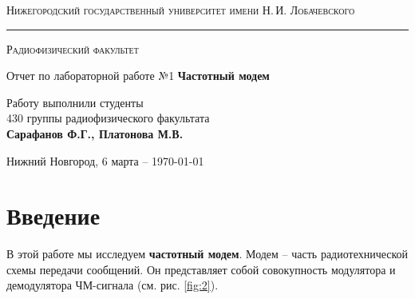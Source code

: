 \documentclass[a4paper,12pt]{article}
\def\labauthor{Сарафанов Ф.Г., Платонова М.В.}
\def\labnumber{1}
\def\labtheme{Частотный модем}
\begin{document}
\begin{titlepage}
\begin{center}

{\textsc{Нижегородский государственный университет имени Н.\,И. Лобачевского}}
\vskip 2pt \hrule \vskip 3pt
{\textsc{Радиофизический факультет}}

\vfill


{{\LARGE Отчет по лабораторной работе №\labnumber}\vskip 12pt {\Huge \bfseries \labtheme}}

	
\vspace{2cm}
{\large Работу выполнили студенты \\[-0.25em] 430 группы радиофизического факультата \\[0.5em] {\Large \bfseries \labauthor}}



\end{center}

\vfill
	
	
	
\begin{center}
	{Нижний Новгород, 6 марта -- \today}
\end{center}

\end{titlepage}
\tableofcontents
\newpage

\section*{Введение}


В этой работе мы исследуем \textbf{частотный модем}. Модем -- часть радиотехнической схемы передачи сообщений. Он представляет собой совокупность модулятора и демодулятора ЧМ-сигнала (см. рис. \ref{fig:2}). 
\end{document}
